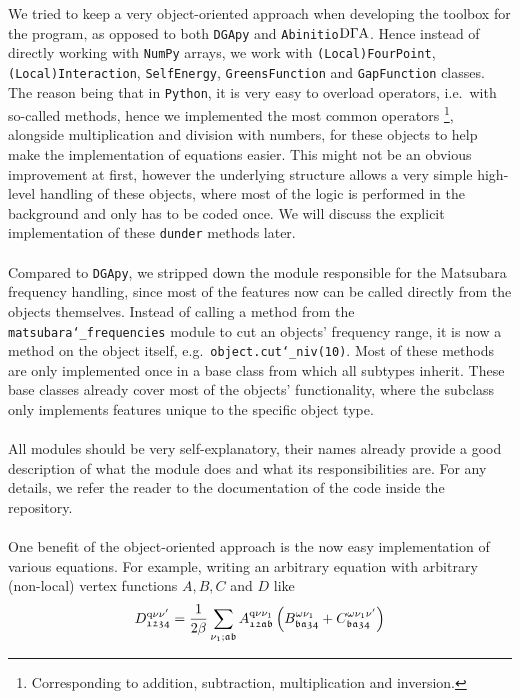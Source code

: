 \documentclass[../../main.tex]{subfiles}
\begin{document}
We tried to keep a very object-oriented approach when developing the toolbox for the program, as opposed to both \texttt{DGApy} and \texttt{Abinitio$\text{D}\Gamma\text{A}$}. Hence instead of directly working with \texttt{NumPy} arrays, we work with \texttt{(Local)FourPoint}, \texttt{(Local)Interaction}, \texttt{SelfEnergy}, \texttt{GreensFunction} and \texttt{GapFunction} classes. The reason being that in \texttt{Python}, it is very easy to overload operators, i.e.\ with so-called  methods, hence we implemented the most common operators \footnote{Corresponding to addition, subtraction, multiplication and inversion.}, alongside multiplication and division with numbers, for these objects to help make the implementation of equations easier. This might not be an obvious improvement at first, however the underlying structure allows a very simple high-level handling of these objects, where most of the logic is performed in the background and only has to be coded once. We will discuss the explicit implementation of these \texttt{dunder} methods later.
\\\\
Compared to \texttt{DGApy}, we stripped down the module responsible for the Matsubara frequency handling, since most of the features now can be called directly from the objects themselves. Instead of calling a method from the \texttt{matsubara\char`_frequencies} module to cut an objects' frequency range, it is now a method on the object itself, e.g.\ \texttt{object.cut\char`_niv(10)}. Most of these methods are only implemented once in a base class from which all subtypes inherit. These base classes already cover most of the objects' functionality, where the subclass only implements features unique to the specific object type.
\\\\
All modules should be very self-explanatory, their names already provide a good description of what the module does and what its responsibilities are. For any details, we refer the reader to the documentation of the code inside the repository.
\\\\
One benefit of the object-oriented approach is the now easy implementation of various equations. For example, writing an arbitrary equation with arbitrary (non-local) vertex functions $A,B,C$ and $D$ like
\begin{align}
	D^{\text{q}\nu\nu'}_{\mathfrak{1234}}=\frac{1}{2\beta} \sum_{\nu_1;\mathfrak{ab}} A^{\text{q}\nu\nu_1}_{\mathfrak{12ab}}\left (B^{\omega\nu_1}_{\mathfrak{ba34}}+C^{\omega\nu_1\nu'}_{\mathfrak{ba34}}\right )
\end{align}
\end{document}
